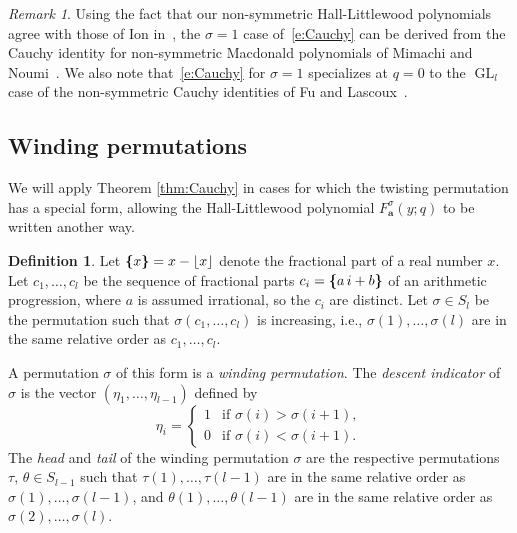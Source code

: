 \documentclass[12pt]{amsart}
\theoremstyle{definition}
\newtheorem{defn}[thm]{Definition}
\theoremstyle{remark}
\newtheorem{remark}[thm]{Remark}
\newcommand{\aA}{{\mathbf a}}
\DeclareMathOperator{\GL}{GL}
\newcommand{\fp}[1]{{\boldsymbol \{} #1 {\boldsymbol \}}}
\begin{document}
\begin{remark}\label{rem:Cauchy-at-q=0}
Using the fact that our non-symmetric Hall-Littlewood polynomials
agree with those of Ion in~\cite{Ion08}, the $\sigma=1$ case
of~\eqref{e:Cauchy} can be derived from the Cauchy identity for
non-symmetric Macdonald polynomials of Mimachi and
Noumi~\cite{MiNou98}.
We also note that~\eqref{e:Cauchy} for $\sigma =1$
specializes at $q = 0$ to the $\GL _{l}$ case of the non-symmetric
Cauchy identities of Fu and Lascoux~\cite{FuLas90}.
\end{remark}



\subsection{Winding permutations}
\label{ss:winding}

We will apply Theorem \ref{thm:Cauchy} in cases for which the
twisting permutation has a special form, allowing the Hall-Littlewood
polynomial $F^{\sigma }_{\aA }(y;q)$ to be written another way.

\begin{defn}\label{def:winding}
Let $\fp{x} = x - \lfloor x \rfloor$ 
denote the fractional part of a real
number $x$.  Let $c_{1},\ldots,c_{l}$ be the sequence of fractional
parts $c_{i} = \fp{a\, i+b}$ of an arithmetic progression, where $a$ is
assumed irrational, so the $c_{i}$ are distinct.  Let $\sigma \in
S_{l}$ be the permutation such that $\sigma (c_{1},\ldots,c_{l})$ is
increasing, i.e., $\sigma (1),\ldots,\sigma (l)$ are in the same
relative order as $c_{1},\ldots,c_{l}$.

A permutation $\sigma $ of this form is a {\em winding permutation}.
The {\em descent indicator} of $\sigma $ is the vector $(\eta
_{1},\ldots,\eta _{l-1})$ defined by
\begin{equation}\label{e:descent-indicator}
\eta _{i} = \begin{cases}
1& \text{if $\sigma (i)>\sigma (i+1)$},\\
0& \text{if $\sigma (i)<\sigma (i+1)$}.
\end{cases}
\end{equation}
The {\em head} and {\em tail} of the winding permutation $\sigma $ are
the respective permutations $\tau ,\, \theta \in S_{l-1}$ such that
$\tau (1),\ldots,\tau (l-1)$ are in the same relative order as $\sigma
(1),\ldots,\sigma (l-1)$, and $\theta (1),\ldots,\theta (l-1)$ are in
the same relative order as $\sigma (2),\ldots,\sigma (l)$.
\end{defn}
\end{document}
